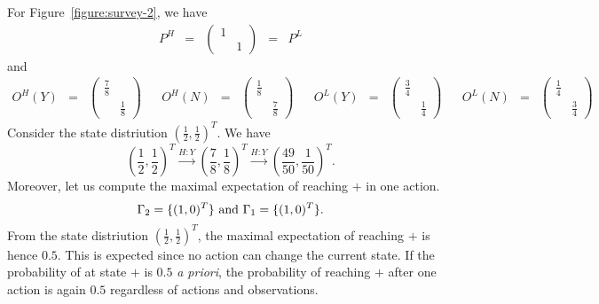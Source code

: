 For Figure~\ref{figure:survey-2}, we have
\[
  \begin{array}{rcccl}
    P^H & = &
      \left(
         \begin{array}{cc}
           1 & \ \\
             & 1 
         \end{array}
      \right)
    & = & P^L
  \end{array}
\]
and
\[
  \begin{array}{rclcrclcrclcrcl}
    O^H (Y) & = &
      \left(
         \begin{array}{cc}
           \frac{7}{8} & \\
                       & \frac{1}{8} 
         \end{array}
      \right)
    &&
    O^H (N) & = &
      \left(
         \begin{array}{cc}
           \frac{1}{8} & \\
                       & \frac{7}{8} 
         \end{array}
      \right)
    &&
    O^L (Y) & = &
      \left(
         \begin{array}{cc}
           \frac{3}{4} & \\
                       & \frac{1}{4} 
         \end{array}
      \right)
    &&
    O^L (N) & = &
      \left(
         \begin{array}{cc}
           \frac{1}{4} & \\
                       & \frac{3}{4} 
         \end{array}
      \right)
  \end{array}
\]
Consider the state distriution $(\frac{1}{2}, \frac{1}{2})^T$. We have
\[
  (\frac{1}{2}, \frac{1}{2})^T
  \overset{H:Y}{\longrightarrow}
  (\frac{7}{8}, \frac{1}{8})^T
  \overset{H:Y}{\longrightarrow}
  (\frac{49}{50}, \frac{1}{50})^T.
\]
Moreover, let us compute the maximal expectation of reaching $+$ in
one action.
\[
  \Gamma_2 = \{ (1, 0)^T \} \textmd{ and }
  \Gamma_1 = \{ (1, 0)^T \}.
\]
From the state distriution $(\frac{1}{2}, \frac{1}{2})^T$, the maximal
expectation of reaching $+$ is hence $0.5$. This is expected since no
action can change the current state. If the probability of at state
$+$ is $0.5$ \emph{a priori}, the probability of reaching $+$ after
one action is again $0.5$ regardless of actions and observations.
